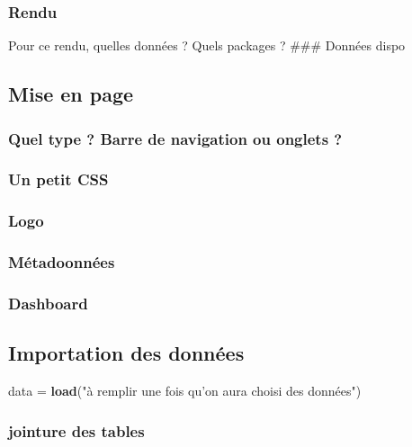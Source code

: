 \documentclass[]{article}
\newenvironment{Shaded}{\begin{snugshade}}{\end{snugshade}}
\newcommand{\KeywordTok}[1]{\textcolor[rgb]{0.13,0.29,0.53}{\textbf{#1}}}
\newcommand{\StringTok}[1]{\textcolor[rgb]{0.31,0.60,0.02}{#1}}
\newcommand{\NormalTok}[1]{#1}
\begin{document}
\subsubsection{Rendu}\label{rendu}

Pour ce rendu, quelles données ? Quels packages ? \#\#\# Données dispo

\subsection{Mise en page}\label{mise-en-page}

\subsubsection{Quel type ? Barre de navigation ou onglets
?}\label{quel-type-barre-de-navigation-ou-onglets}

\subsubsection{Un petit CSS}\label{un-petit-css}

\subsubsection{Logo}\label{logo}

\subsubsection{Métadoonnées}\label{metadoonnees}

\subsubsection{Dashboard}\label{dashboard}

\subsection{Importation des données}\label{importation-des-donnees}

\begin{Shaded}
\begin{Highlighting}[]
\NormalTok{data =}\StringTok{ }\KeywordTok{load}\NormalTok{(}\StringTok{"à remplir une fois qu'on aura choisi des données"}\NormalTok{) }
\end{Highlighting}
\end{Shaded}

\subsubsection{jointure des tables}\label{jointure-des-tables}
\end{document}
